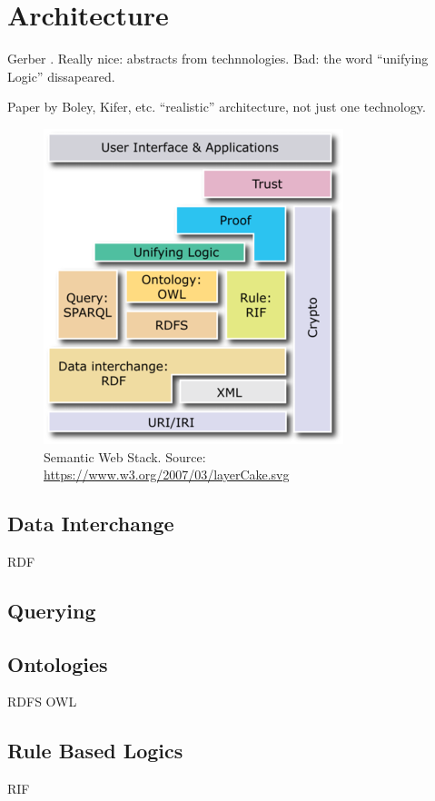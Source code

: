 \section{Architecture}

Gerber \cite{Gerber} \cite{Gerber2}. Really nice: abstracts from technnologies. Bad: the word ``unifying Logic'' dissapeared.

\cite{rearch} Paper by Boley, Kifer, etc. ``realistic'' architecture, not just one technology. 

\begin{figure}[h!]
	\centering
	\includegraphics{Semantic_Web_Stack}
	\caption{Semantic Web Stack. Source: \url{https://www.w3.org/2007/03/layerCake.svg}}
	\label{fig:stack}
\end{figure}
\subsection{Data Interchange}
RDF

\cite{rdf}
\subsection{Querying}
\subsection{Ontologies}
RDFS
OWL
\subsection{Rule Based Logics}
RIF

